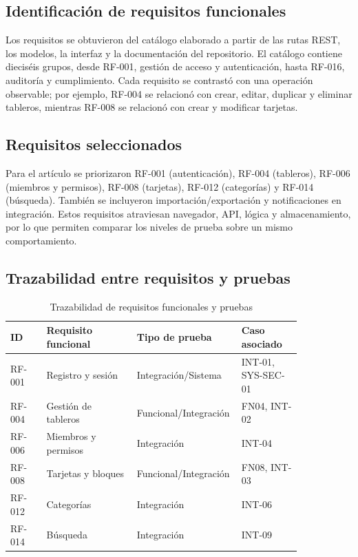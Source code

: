 \documentclass[conference]{IEEEtran}
\begin{document}
\subsection{Identificación de requisitos funcionales}
Los requisitos se obtuvieron del catálogo elaborado a partir de las rutas REST, los modelos, la interfaz y la documentación del repositorio. El catálogo contiene dieciséis grupos, desde RF-001, gestión de acceso y autenticación, hasta RF-016, auditoría y cumplimiento. Cada requisito se contrastó con una operación observable; por ejemplo, RF-004 se relacionó con crear, editar, duplicar y eliminar tableros, mientras RF-008 se relacionó con crear y modificar tarjetas.
\vspace{\baselineskip}

\subsection{Requisitos seleccionados}
Para el artículo se priorizaron RF-001 (autenticación), RF-004 (tableros), RF-006 (miembros y permisos), RF-008 (tarjetas), RF-012 (categorías) y RF-014 (búsqueda). También se incluyeron importación/exportación y notificaciones en integración. Estos requisitos atraviesan navegador, API, lógica y almacenamiento, por lo que permiten comparar los niveles de prueba sobre un mismo comportamiento.
\vspace{\baselineskip}

\subsection{Trazabilidad entre requisitos y pruebas}

\begin{table}[htbp]
\caption{Trazabilidad de requisitos funcionales y pruebas}
\label{tab:trazabilidad_requisitos}
\centering
\begin{tabular}{|p{0.12\linewidth}|p{0.30\linewidth}|p{0.22\linewidth}|p{0.20\linewidth}|}
\hline
\textbf{ID} & \textbf{Requisito funcional} & \textbf{Tipo de prueba} & \textbf{Caso asociado} \\
\hline
RF-001 & Registro y sesión & Integración/Sistema & INT-01, SYS-SEC-01 \\
\hline
RF-004 & Gestión de tableros & Funcional/Integración & FN04, INT-02 \\
\hline
RF-006 & Miembros y permisos & Integración & INT-04 \\
\hline
RF-008 & Tarjetas y bloques & Funcional/Integración & FN08, INT-03 \\
\hline
RF-012 & Categorías & Integración & INT-06 \\
\hline
RF-014 & Búsqueda & Integración & INT-09 \\
\hline
\end{tabular}
\end{table}
\vspace{\baselineskip}
\end{document}
